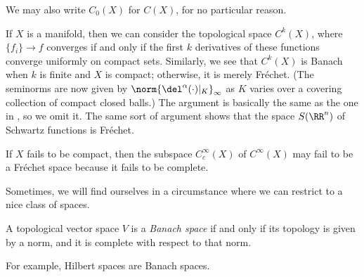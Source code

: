 \documentclass[../notes.tex]{subfiles}
\begin{document}
\begin{remark}
	We may also write $C_0(X)$ for $C(X)$, for no particular reason.
\end{remark}
\begin{example}
	If $X$ is a manifold, then we can consider the topological space $C^k(X)$, where $\{f_i\}\to f$ converges if and only if the first $k$ derivatives of these functions converge uniformly on compact sets. Similarly, we see that $C^k(X)$ is Banach when $k$ is finite and $X$ is compact; otherwise, it is merely Fr\'echet. (The seminorms are now given by $\norm{\del^\alpha(\cdot)|_K}_\infty$ as $K$ varies over a covering collection of compact closed balls.) The argument is basically the same as the one in , so we omit it. The same sort of argument shows that the space $S(\RR^n)$ of Schwartz functions is Fr\'echet.
\end{example}
\begin{nex}
	If $X$ fails to be compact, then the subspace $C_c^\infty(X)$ of $C^\infty(X)$ may fail to be a Fr\'echet space because it fails to be complete.
\end{nex}
Sometimes, we will find ourselves in a circumstance where we can restrict to a nice class of spaces.
\begin{definition}[Banach]
	A topological vector space $V$ is a \textit{Banach space} if and only if its topology is given by a norm, and it is complete with respect to that norm.
\end{definition}
For example, Hilbert spaces are Banach spaces.
\end{document}
